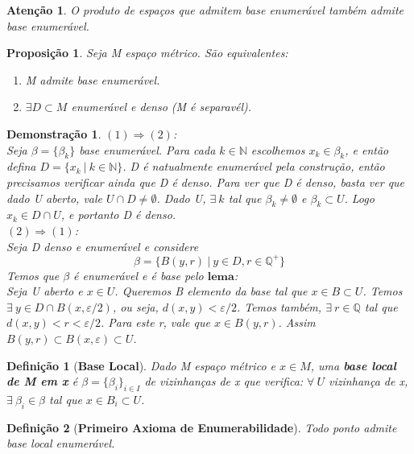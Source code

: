 \documentclass{article}
\newtheorem*{definition}{Definição}
\newtheorem*{atencao}{Atenção}
\newtheorem*{proposicao}{Proposição}
\newtheorem*{prova}{Demonstração}
\newcommand{\eps}{\varepsilon}
\begin{document}
\begin{atencao}
    O produto de espaços que admitem base enumerável também admite base enumerável.
\end{atencao}

\begin{proposicao}
    Seja M espaço métrico. São equivalentes:
    \begin{enumerate}
        \item M admite base enumerável.
        \item $\exists D \subset M$ enumerável e denso (M é separavél).
    \end{enumerate}
\end{proposicao}

\begin{prova}
    $(1) \Rightarrow (2)$: \\
    Seja $\beta = \{ \beta_k\}$ base enumerável. 
    Para cada $k \in \mathbb{N}$ escolhemos $x_k \in \beta_k$,
    e então defina $D = \{x_k \: | \: k \in \mathbb{N}\}$. 
    D é natualmente enumerável pela construção, então precisamos verificar ainda que D é denso.
    Para ver que D é denso, basta ver que dado U aberto, vale $U \cap D \neq \emptyset$.
    Dado U, $\exists \: k$ tal que $\beta_k \neq \emptyset$ e $\beta_k \subset U$.
    Logo $x_k \in D \cap U$, e portanto D é denso.\\
    $(2) \Rightarrow (1)$: \\
    Seja D denso e enumerável e considere
    \[\beta = \{B(y, r) \: | \: y \in D, r \in \mathbb{Q}^+\}\]
    Temos que $\beta$ é enumerável e é base pelo $\textbf{lema}$:\\
    Seja U aberto e $x \in U$. Queremos B elemento da base tal que $x \in B \subset U$.
    Temos $\exists \: y \in D \cap B(x, \eps / 2)$, ou seja, $d(x, y) < \eps / 2$.
    Temos também, $\exists \: r \in \mathbb{Q}$ tal que $d(x, y) < r < \eps / 2$.
    Para este r, vale que $x \in B(y, r)$. 
    Assim $B(y, r) \subset B(x, \eps) \subset U$.
\end{prova}

\begin{definition}[\textbf{Base Local}]
    Dado M espaço métrico e $x \in M$, uma \textbf{base local de M em x} é $\beta = \{\beta_i\}_{i \in I}$
    de vizinhanças de x que verifica:
    $\forall \: U$ vizinhança de x, $\exists \: \beta_i \in \beta$ tal que $x \in B_i \subset U$.
\end{definition}

\begin{definition}[\textbf{Primeiro Axioma de Enumerabilidade}]
    Todo ponto admite base local enumerável.
\end{definition}
\end{document}

